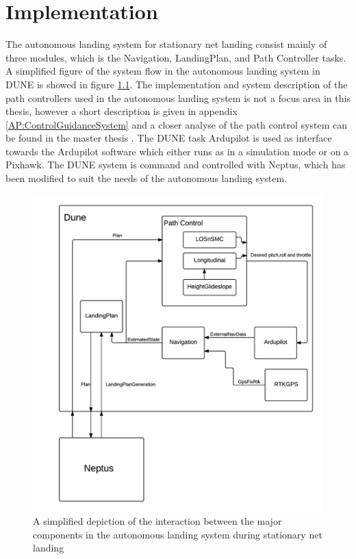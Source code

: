 \chapter{Implementation}\label{Ch:Implementation}
The autonomous landing system for stationary net landing consist mainly of three modules, which is the Navigation, LandingPlan, and Path Controller tasks. A simplified figure of the system flow in the autonomous landing system in DUNE is showed in figure \ref{fig:DuneSystem}. The implementation and system description of the path controllers used in the autonomous landing system is not a focus area in this thesis, however a short description is given in appendix \ref{AP:ControlGuidanceSystem} and a closer analyse of the path control system can be found in the master thesis \citep{Sigurd}. The DUNE task Ardupilot is used as interface towards the Ardupilot software which either runs as in a simulation mode or on a Pixhawk. The DUNE system is command  and controlled with Neptus, which has been modified to suit the needs of the autonomous landing system.
\begin{figure}[H]
	\centering
		\includegraphics[scale=0.8]{figs/DUNESystem.png}
		\caption{A simplified depiction of the interaction between the major components in the autonomous landing system during stationary net landing}
		\label{fig:DuneSystem}
\end{figure}
